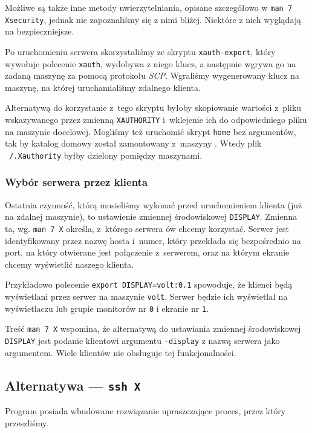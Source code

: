 \documentclass[a4paper,11pt]{article}
\begin{document}
Możliwe są także inne metody uwierzytelniania, opisane szczegółowo w \texttt{man
7 Xsecurity}, jednak nie zapoznaliśmy się z nimi bliżej. Niektóre z nich
wyglądają na bezpieczniejsze.

Po uruchomieniu serwera skorzystaliśmy ze skryptu \texttt{xauth-export}, który
wywołuje polecenie \texttt{xauth}, wydobywa z niego klucz, a następnie wgrywa go
na zadaną maszynę za pomocą protokołu \emph{SCP}. Wgraliśmy wygenerowany klucz
na maszynę, na której uruchamialiśmy zdalnego klienta.

Alternatywą do korzystanie z~tego skryptu byłoby skopiowanie wartości z~pliku
wskazywanego przez zmienną \texttt{XAUTHORITY} i~wklejenie ich do odpowiedniego
pliku na maszynie docelowej. Mogliśmy też uruchomić skrypt \texttt{home} bez
argumentów, tak by katalog domowy został zamontowany z~maszyny \volt. Wtedy plik
\texttt{~/.Xauthority} byłby dzielony pomiędzy maszynami.

\subsubsection{Wybór serwera \xbin{} przez klienta}

Ostatnia czynność, którą musieliśmy wykonać przed uruchomieniem klienta (już na
zdalnej maszynie), to ustawienie zmiennej środowiskowej \texttt{DISPLAY}.
Zmienna ta, wg. \texttt{man 7 X} określa, z~którego serwera \xbin ów chcemy
korzystać. Serwer jest identyfikowany przez nazwę hosta i~numer, który przekłada
się bezpośrednio na port, na który otwierane jest połączenie z~serwerem, oraz na
którym ekranie chcemy wyświetlić naszego klienta.

Przykładowo polecenie \texttt{export DISPLAY=volt:0.1} spowoduje, że klienci
\xbin{} będą wyświetlani przez serwer na maszynie \texttt{volt}. Serwer \xbin{}
będzie ich wyświetlał na wyświetlaczu lub grupie monitorów nr \texttt{0} i
ekranie nr \texttt{1}.

Treść \texttt{man 7 X} wspomina, że alternatywą do ustawiania zmiennej
środowiskowej \texttt{DISPLAY} jest podanie klientowi \xbin argumentu
\texttt{-display} z nazwą serwera jako argumentem. Wiele klientów nie obsługuje
tej funkcjonalności.

\subsection{Alternatywa --- \texttt{ssh \dywiz X}}
Program \ssh{} posiada wbudowane rozwiązanie upraszczające proces, przez który
przeszliśmy.
\end{document}
